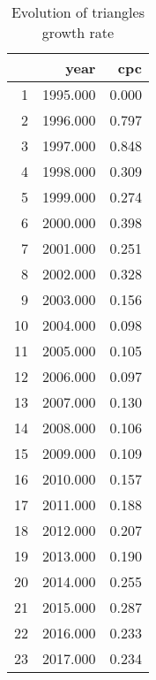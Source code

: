 \begin{table}[ht]
\centering
\begin{tabular}{rrr}
  \hline
 & year & cpc \\ 
  \hline
1 & 1995.000 & 0.000 \\ 
  2 & 1996.000 & 0.797 \\ 
  3 & 1997.000 & 0.848 \\ 
  4 & 1998.000 & 0.309 \\ 
  5 & 1999.000 & 0.274 \\ 
  6 & 2000.000 & 0.398 \\ 
  7 & 2001.000 & 0.251 \\ 
  8 & 2002.000 & 0.328 \\ 
  9 & 2003.000 & 0.156 \\ 
  10 & 2004.000 & 0.098 \\ 
  11 & 2005.000 & 0.105 \\ 
  12 & 2006.000 & 0.097 \\ 
  13 & 2007.000 & 0.130 \\ 
  14 & 2008.000 & 0.106 \\ 
  15 & 2009.000 & 0.109 \\ 
  16 & 2010.000 & 0.157 \\ 
  17 & 2011.000 & 0.188 \\ 
  18 & 2012.000 & 0.207 \\ 
  19 & 2013.000 & 0.190 \\ 
  20 & 2014.000 & 0.255 \\ 
  21 & 2015.000 & 0.287 \\ 
  22 & 2016.000 & 0.233 \\ 
  23 & 2017.000 & 0.234 \\ 
   \hline
\end{tabular}
\caption{Evolution of triangles growth rate} 
\end{table}
